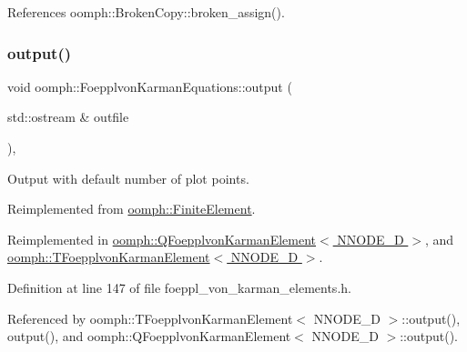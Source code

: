 References oomph\+::\+Broken\+Copy\+::broken\+\_\+assign().

\mbox{\label{classoomph_1_1FoepplvonKarmanEquations_a44739d9c804206ea60671b0de07ad154}} 
\subsubsection{\texorpdfstring{output()}{output()}\hspace{0.1cm}{\footnotesize\ttfamily [1/4]}}
{\footnotesize\ttfamily void oomph\+::\+Foepplvon\+Karman\+Equations\+::output (\begin{DoxyParamCaption}\item[{std\+::ostream \&}]{outfile }\end{DoxyParamCaption})\hspace{0.3cm}{\ttfamily [inline]}, {\ttfamily [virtual]}}



Output with default number of plot points. 



Reimplemented from \hyperlink{classoomph_1_1FiniteElement_a2ad98a3d2ef4999f1bef62c0ff13f2a7}{oomph\+::\+Finite\+Element}.



Reimplemented in \hyperlink{classoomph_1_1QFoepplvonKarmanElement_a283a3078077c6feefb9894e17e9f7b7a}{oomph\+::\+Q\+Foepplvon\+Karman\+Element$<$ N\+N\+O\+D\+E\+\_\+D $>$}, and \hyperlink{classoomph_1_1TFoepplvonKarmanElement_abc6698f8275d8fc4e526b2d7c7fef6de}{oomph\+::\+T\+Foepplvon\+Karman\+Element$<$ N\+N\+O\+D\+E\+\_\+D $>$}.



Definition at line 147 of file foeppl\+\_\+von\+\_\+karman\+\_\+elements.\+h.



Referenced by oomph\+::\+T\+Foepplvon\+Karman\+Element$<$ N\+N\+O\+D\+E\+\_\+D $>$\+::output(), output(), and oomph\+::\+Q\+Foepplvon\+Karman\+Element$<$ N\+N\+O\+D\+E\+\_\+D $>$\+::output().

\mbox{\label{classoomph_1_1FoepplvonKarmanEquations_aa97cf4d70c7c059e6cb38557282156a5}} 
